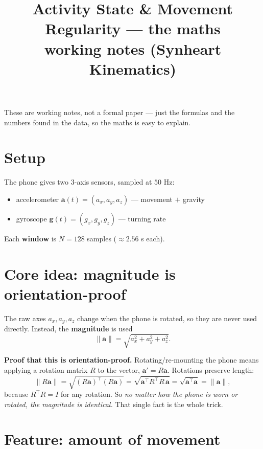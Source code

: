 \documentclass[11pt]{article}
\title{Activity State \& Movement Regularity --- the maths\\[2pt]
\large working notes (Synheart Kinematics)}
\date{}
\begin{document}
\maketitle

These are working notes, not a formal paper --- just the formulas and the
numbers found in the data, so the maths is easy to explain.

\section{Setup}

The phone gives two 3-axis sensors, sampled at $50$ Hz:
\begin{itemize}[noitemsep]
  \item accelerometer $\mathbf{a}(t)=(a_x,a_y,a_z)$ \quad --- movement $+$ gravity
  \item gyroscope $\mathbf{g}(t)=(g_x,g_y,g_z)$ \quad --- turning rate
\end{itemize}
Each \textbf{window} is $N=128$ samples ($\approx 2.56$ s each).

\section{Core idea: magnitude is orientation-proof}

The raw axes $a_x,a_y,a_z$ change when the phone is rotated, so they are never used
directly. Instead, the \textbf{magnitude} is used
\[
  \lVert \mathbf{a}\rVert=\sqrt{a_x^{2}+a_y^{2}+a_z^{2}} .
\]

\textbf{Proof that this is orientation-proof.}
Rotating/re-mounting the phone means applying a rotation matrix $R$ to the vector,
$\mathbf{a}'=R\mathbf{a}$. Rotations preserve length:
\[
  \lVert R\mathbf{a}\rVert
  =\sqrt{(R\mathbf{a})^{\top}(R\mathbf{a})}
  =\sqrt{\mathbf{a}^{\top}R^{\top}R\,\mathbf{a}}
  =\sqrt{\mathbf{a}^{\top}\mathbf{a}}
  =\lVert \mathbf{a}\rVert ,
\]
because $R^{\top}R=I$ for any rotation. So \emph{no matter how the phone is worn or
rotated, the magnitude is identical.} That single fact is the whole trick.

\section{Feature: amount of movement}
\end{document}
